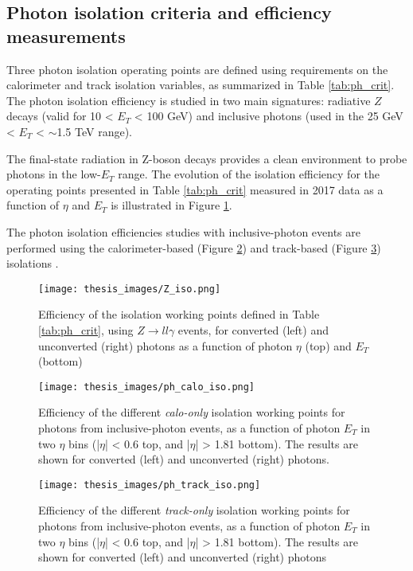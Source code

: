 \documentclass[a4paper, oneside, 11pt, openright]{book}
\begin{document}
			
			\subsection{Photon isolation criteria and efficiency measurements}
			Three photon isolation operating points are defined using requirements on the calorimeter and track isolation variables, as summarized in Table \ref{tab:ph_crit}. The photon isolation efficiency is studied in two main signatures: radiative $Z$ decays (valid for 10 < $E_T$ < 100 GeV) and inclusive photons (used in the 25 GeV < $E_T$ < $\sim$1.5 TeV range).
			
			The final-state radiation in Z-boson decays provides a clean environment to probe photons in the low-$E_T$ range. The evolution of the isolation efficiency for the operating points presented in Table \ref{tab:ph_crit} measured in 2017 data \cite{Aad_2019} as a function of $\eta$ and $E_T$ is illustrated in Figure \ref{fig:Z_iso}. 
			
			The photon isolation efficiencies studies with inclusive-photon events are performed using the calorimeter-based (Figure \ref{fig:ph_calo_iso}) and track-based (Figure \ref{fig:ph_tarck_iso}) isolations \cite{Aad_2019}.
			
			\begin{figure}
				\centering
				\texttt{[image: thesis\_images/Z\_iso.png]} 
				\caption{Efficiency of the isolation working points defined in Table \ref{tab:ph_crit}, using $Z\to ll\gamma$ events, for converted (left) and unconverted (right) photons as a function of photon $\eta$ (top) and $E_T$ (bottom)}
				\label{fig:Z_iso}
			\end{figure}
			\begin{figure}
				\centering
				\texttt{[image: thesis\_images/ph\_calo\_iso.png]} 
				\caption{Efficiency of the different \textit{calo-only} isolation working points for photons from inclusive-photon events, as a function of photon $E_T$ in two $\eta$ bins (|$\eta$| < 0.6 top, and |$\eta$| > 1.81 bottom). The results are shown for converted (left) and unconverted (right) photons.}
				\label{fig:ph_calo_iso}
			\end{figure}
			\begin{figure}
				\centering
				\texttt{[image: thesis\_images/ph\_track\_iso.png]} 
				\caption{Efficiency of the different \textit{track-only} isolation working points for photons from inclusive-photon events, as a function of photon $E_T$ in two $\eta$ bins (|$\eta$| < 0.6 top, and |$\eta$| > 1.81 bottom). The results are shown for converted (left) and unconverted (right) photons}
				\label{fig:ph_tarck_iso}
			\end{figure}
			
\end{document}
